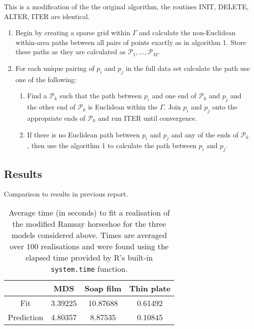 \documentclass[a4paper,10pt]{article}
\begin{document}
This is a modification of the the original algorithm, the routines INIT, DELETE, ALTER, ITER are identical.

\begin{enumerate}
 \item Begin by creating a sparse grid within $\Gamma$ and calculate the non-Euclidean within-area paths between all pairs of points exactly as in algorithm 1. Store these paths as they are calculated as $\mathcal{P}_1,\ldots, \mathcal{P}_M$.
 
\item For each unique pairing of $p_i$ and $p_j$ in the full data set calculate the path use one of the following:

\begin{enumerate}

\item Find a $\mathcal{P}_k$ such that the path between $p_i$ and one end of $\mathcal{P}_k$ and $p_j$ and the other end of $\mathcal{P}_k$ is Euclidean within the $\Gamma$. Join $p_i$ and $p_j$ onto the appropriate ends of $\mathcal{P}_k$ and run ITER until convergence.

\item If there is no Euclidean path between $p_i$ and $p_j$ and any of the ends of $\mathcal{P}_k$, then use the algorithm 1 to calculate the path between $p_i$ and $p_j$. 

\end{enumerate}
\end{enumerate}


\subsection{Results}

Comparison to results in previous report.


\begin{table}[ht]
\centering
\begin{tabular}{c || c c c}
 & MDS & Soap film & Thin plate\\ 
\hline
Fit & 3.39225 & 10.87688 & 0.61492\\
Prediction & 4.80357 & 8.87535 & 0.10845\\
\end{tabular}
\label{ramsaytime}
\caption{Average time (in seconds) to fit a realisation of the modified Ramsay horseshoe for the three models considered above. Times are averaged over 100 realisations and were found using the elapsed time provided by \textsf{R}'s built-in \texttt{system.time} function.}
\end{table}
\end{document}
